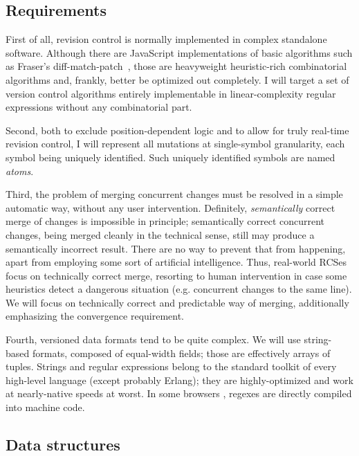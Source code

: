 \documentclass{sig-alternate}
\begin{document}
\subsection {Requirements} \label{sec:req}
First of all, revision control is normally implemented in complex standalone software.
Although there are JavaScript implementations of basic algorithms such as Fraser's diff-match-patch~\cite{diff-match-patch}, those are heavyweight heuristic-rich combinatorial algorithms and, frankly, better be optimized out completely.
I will target a set of version control algorithms entirely implementable in linear-complexity regular expressions without any combinatorial part.

Second, both to exclude position-dependent logic and to allow for truly real-time revision control, I will represent all mutations at single-symbol granularity, each symbol being uniquely identified.
Such uniquely identified symbols are named \emph{atoms}.

Third, the problem of merging concurrent changes must be resolved in a simple automatic way, without any user intervention.
Definitely, \emph{semantically} correct merge of changes is impossible in principle; semantically correct concurrent changes, being merged cleanly in the technical sense, still may produce a semantically incorrect result.
There are no way to prevent that from happening, apart from employing some sort of artificial intelligence.
Thus, real-world RCSes focus on technically correct merge, resorting to human intervention in case some heuristics detect a dangerous situation (e.g. concurrent changes to the same line).
We will focus on technically correct and predictable way of merging, additionally emphasizing the convergence requirement.

Fourth, versioned data formats tend to be quite complex.
We will use string-based formats, composed of equal-width fields; those are effectively arrays of tuples.
Strings and regular expressions belong to the standard toolkit of every high-level language (except probably Erlang); they are highly-optimized and work at nearly-native speeds at worst.
In some browsers \cite{irregex,wrec}, regexes are directly compiled into machine code.

\subsection{Data structures}	\label{sec:data}

\newcommand{\aum}{{\fontspec{Devanagari MT}\selectfont ॐ}}
\newcommand{\eoa}{{\fontspec{Geeza Pro}\selectfont ۝}}
\newcommand{\bsp}{{\fontspec{Apple Symbols} ⌫}}
\newcommand{\cnc}{{\fontspec{Apple Symbols} ⌦}}
\newcommand{\zero}{{\fontspec{Apple Symbols} ⌀}}
\end{document}
